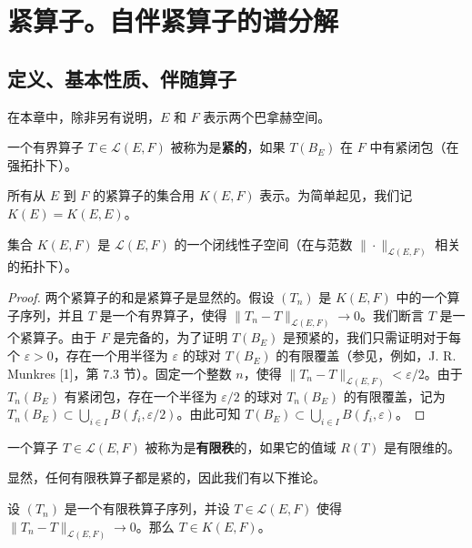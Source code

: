 \chapter{紧算子。自伴紧算子的谱分解}

\section{定义、基本性质、伴随算子}

在本章中，除非另有说明，\(E\) 和 \(F\) 表示两个巴拿赫空间。

\begin{definition}
一个有界算子 \(T \in \mathcal{L}(E, F)\) 被称为是\textbf{紧的}，如果 \(T(B_E)\) 在 \(F\) 中有紧闭包（在强拓扑下）。
\end{definition}

所有从 \(E\) 到 \(F\) 的紧算子的集合用 \(K(E, F)\) 表示。为简单起见，我们记 \(K(E) = K(E, E)\)。

\begin{theorem}\label{theorem:6.1}
集合 \(K(E, F)\) 是 \(\mathcal{L}(E, F)\) 的一个闭线性子空间（在与范数 \(\|\cdot\|_{\mathcal{L}(E, F)}\) 相关的拓扑下）。
\end{theorem}

\begin{proof}
两个紧算子的和是紧算子是显然的。假设 \((T_n)\) 是 \(K(E, F)\) 中的一个算子序列，并且 \(T\) 是一个有界算子，使得 \(\|T_n - T\|_{\mathcal{L}(E, F)} \to 0\)。我们断言 \(T\) 是一个紧算子。由于 \(F\) 是完备的，为了证明 \(T(B_E)\) 是预紧的，我们只需证明对于每个 \(\varepsilon > 0\)，存在一个用半径为 \(\varepsilon\) 的球对 \(T(B_E)\) 的有限覆盖（参见，例如，J. R. Munkres [1]，第 7.3 节）。固定一个整数 \(n\)，使得 \(\|T_n - T\|_{\mathcal{L}(E, F)} < \varepsilon/2\)。由于 \(T_n(B_E)\) 有紧闭包，存在一个半径为 \(\varepsilon/2\) 的球对 \(T_n(B_E)\) 的有限覆盖，记为 \(T_n(B_E) \subset \bigcup_{i \in I} B(f_i, \varepsilon/2)\)。由此可知 \(T(B_E) \subset \bigcup_{i \in I} B(f_i, \varepsilon)\)。
\end{proof}

\begin{definition}
一个算子 \(T \in \mathcal{L}(E, F)\) 被称为是\textbf{有限秩}的，如果它的值域 \(R(T)\) 是有限维的。
\end{definition}

显然，任何有限秩算子都是紧的，因此我们有以下推论。

\begin{corollary}\label{corollary:6.2}
设 \((T_n)\) 是一个有限秩算子序列，并设 \(T \in \mathcal{L}(E, F)\) 使得 \(\|T_n - T\|_{\mathcal{L}(E, F)} \to 0\)。那么 \(T \in K(E, F)\)。
\end{corollary}

